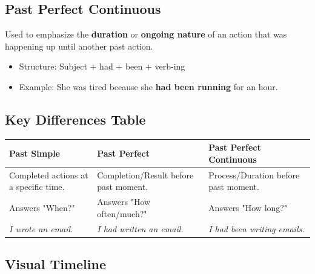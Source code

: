 \subsection{Past Perfect Continuous}
Used to emphasize the \textbf{duration} or \textbf{ongoing nature} of an action that was happening up until another past action.
\begin{itemize}
    \item Structure: Subject + had + been + verb-ing
    \item Example: She was tired because she \textbf{had been running} for an hour.
\end{itemize}

\subsection{Key Differences Table}
\begin{longtable}{|p{4cm}|p{4cm}|p{4.5cm}|}
    \hline
    \textbf{Past Simple} & \textbf{Past Perfect} & \textbf{Past Perfect Continuous} \\ \hline
    Completed actions at a specific time. & Completion/Result before past moment. & Process/Duration before past moment. \\ \hline
    Answers "When?" & Answers "How often/much?" & Answers "How long?" \\ \hline
    \textit{I wrote an email.} & \textit{I had written an email.} & \textit{I had been writing emails.} \\ \hline
\end{longtable}

\subsection{Visual Timeline}
\begin{center}
\end{center}

